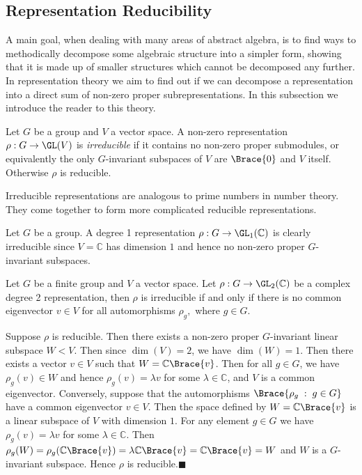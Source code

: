 \documentclass[../Project.tex]{subfiles}
\begin{document}
\newpage
\subsection{Representation Reducibility}
A main goal, when dealing with many areas of abstract algebra, is to find ways to methodically decompose some algebraic structure into a simpler form, showing that it is made up of smaller structures which cannot be decomposed any further. In representation theory we aim to find out if we can decompose a representation into a direct sum of non-zero proper subrepresentations. In this subsection we introduce the reader to this theory.

\begin{defi}
	Let $G$ be a group and $V$ a vector space. A non-zero representation $\rho : G \to \GL(V)$ is \textit{irreducible} if it contains no non-zero proper submodules, or equivalently the only $G$-invariant subspaces of $V$ are $\Brace{0}$ and $V$ itself. Otherwise $\rho$ is reducible.
\end{defi}

Irreducible representations are analogous to prime numbers in number theory. They come together to form more complicated reducible representations.

\begin{prop}[{\cite[Example 3.1.16]{1}}]
	Let $G$ be a group. A degree 1 representation $\rho : G \to \GL_1(\mathbb{C})$ is clearly irreducible since $V = \mathbb{C}$ has dimension $1$ and hence no non-zero proper $G$-invariant subspaces.
\end{prop}

\begin{prop}[{\cite[page 18, 3.1.19]{1}}]
	Let $G$ be a finite group and $V$ a vector space. Let $\rho : G \to \GL_2(\mathbb{C})$ be a complex degree 2 representation, then $\rho$ is irreducible if and only if there is no common eigenvector $v \in V$ for all automorphisms $\rho_g,$ where $g \in G$.
\end{prop}
\begin{proo*}
	Suppose $\rho$ is reducible. Then there exists a non-zero proper $G$-invariant linear subspace $W < V$. Then since $\dim(V) = 2$, we have $\dim(W) = 1$. Then there exists a vector $v \in V$ such that $W = \mathbb{C}\Brace{v}$. Then for all $g \in G$, we have $\rho_g(v) \in W$ and hence $\rho_g(v) = \lambda v$ for some $\lambda \in \mathbb{C}$, and $V$ is a common eigenvector. Conversely, suppose that the automorphisms $\Brace{\rho_g \;:\; g \in G}$ have a common eigenvector $v \in V$. Then the space defined by $W = \mathbb{C}\Brace{v}$ is a linear subspace of $V$ with dimension $1$. For any element $g \in G$ we have $\rho_g(v) = \lambda v$ for some $\lambda \in \mathbb{C}$. Then $\rho_g(W) = \rho_g(\mathbb{C}\Brace{v}) = \lambda\mathbb{C}\Brace{v} = \mathbb{C}\Brace{v} = W$ and $W$ is a $G$-invariant subspace. Hence $\rho$ is reducible.\hfill$\blacksquare$
\end{proo*}
\end{document}
